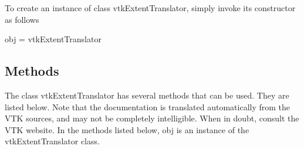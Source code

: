 To create an instance of class vtk\-Extent\-Translator, simply invoke its constructor as follows \begin{DoxyVerb}  obj = vtkExtentTranslator
\end{DoxyVerb}
 \hypertarget{vtkwidgets_vtkxyplotwidget_Methods}{}\subsection{Methods}\label{vtkwidgets_vtkxyplotwidget_Methods}
The class vtk\-Extent\-Translator has several methods that can be used. They are listed below. Note that the documentation is translated automatically from the V\-T\-K sources, and may not be completely intelligible. When in doubt, consult the V\-T\-K website. In the methods listed below, {\ttfamily obj} is an instance of the vtk\-Extent\-Translator class. 
